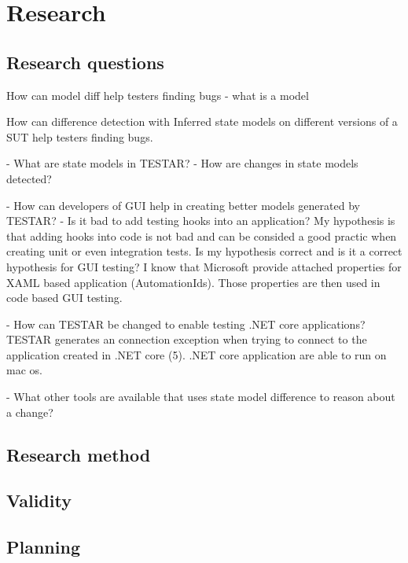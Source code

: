 \section{Research}

\subsection{Research questions}

How can model diff help testers finding bugs
- what is a model

How can difference detection with Inferred state models on different versions of a SUT help testers finding bugs.

- What are state models in TESTAR?
- How are changes in state models detected?

- How can developers of GUI help in creating better models generated by TESTAR?
- Is it bad to add testing hooks into an application? My hypothesis is that adding hooks into code is not bad and can be consided a good practic when creating unit or even integration tests. Is my hypothesis correct and is it a correct hypothesis for GUI testing? I know that Microsoft provide attached properties for XAML based application (AutomationIds). Those properties are then used in code based GUI testing.


- How can TESTAR be changed to enable testing .NET core applications?
TESTAR generates an connection exception when trying to connect to the application created in .NET core (5). .NET core application are able to run on mac os. 

- What other tools are available that uses state model difference to reason about a change? 






\subsection{Research method}

\subsection{Validity}

\subsection{Planning}